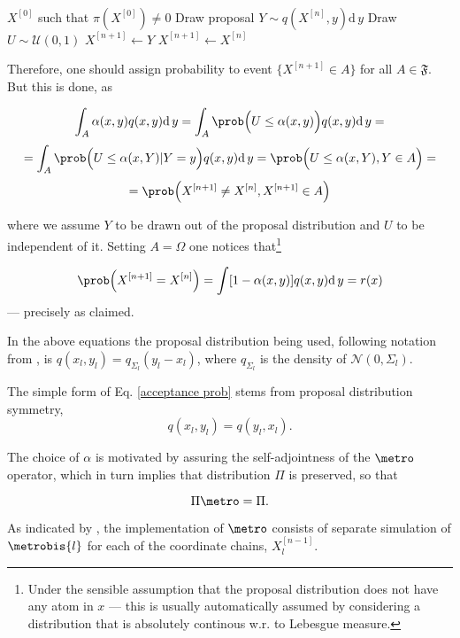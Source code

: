 \begin{Algo}
	\ 	
	\begin{algorithmic}
		\Require $X^{[0]}$ such that $\pi(X^{[0]}) \not=0$
				\State Draw proposal $Y \sim q(X^{[n]},y)\mathrm{d}\,y$
				\State Draw $U \sim \mathcal{U}(0,1)$
					\State $X^{[n+1]} \gets Y$	
				\Else
					\State $X^{[n+1]} \gets X^{[n]}$	
				\EndIf
			\EndFor			
		\EndProcedure	 
	\end{algorithmic}		
\end{Algo}

Therefore, one should assign probability to event $\{ X^{[n+1]} \in A\}$ for all $A \in \mathfrak{F}$. But this is done, as

$$\int_A  \alpha(x,y) q(x,y) \mathrm{d}\,y = \int_A \prob \Big( U \leq \alpha(x,y) \Big)q(x,y) \mathrm{d}\,y =$$
$$
	=\int_A \prob\Big( U \leq \alpha(x,Y) | Y=y \Big)q(x,y) \mathrm{d}\,y = \prob\Big( U \leq \alpha(x,Y), Y \in A \Big)=
$$
$$
	= \prob\Big(X^{[n+1]} \not= X^{[n]} , X^{[n+1]} \in A \Big)
$$

where we assume $Y$ to be drawn out of the proposal distribution and $U$ to be independent of it. Setting $A = \Omega$ one notices that\footnote{Under the sensible assumption that the proposal distribution does not have any atom in $x$ --- this is usually automatically assumed by considering a distribution that is absolutely continous w.r. to Lebesgue measure.} 

$$ \prob\Big(X^{[n+1]} = X^{[n]}\Big) = \int  [ 1 - \alpha(x,y)] q(x,y) \mathrm{d}\,y = r(x)$$
--- precisely as claimed. 

In the above equations the proposal distribution being used, following notation from \cite{CharlesJ.Geyer}, is $q(x_l,y_l) = q_{\Sigma_l} (y_l - x_l)$, where $q_{\Sigma_l}$ is the density of $\mathcal{N}(0, \Sigma_l)$. 

The simple form of Eq. \ref{acceptance prob} stems from proposal distribution symmetry, $$q(x_l,y_l) = q(y_l,x_l).$$

The choice of $\alpha$ is motivated by assuring the self-adjointness of the $\metro$ operator, which in turn implies that distribution $\Pi$ is preserved, so that
	
\begin{equation}
	\Pi \metro = \Pi.		
\end{equation}	

As indicated by \cite{BM2}, the implementation of $\metro$ consists of separate simulation of $\metrobis{l}$ for each of the coordinate chains,  $X^{[n-1]}_l$.


